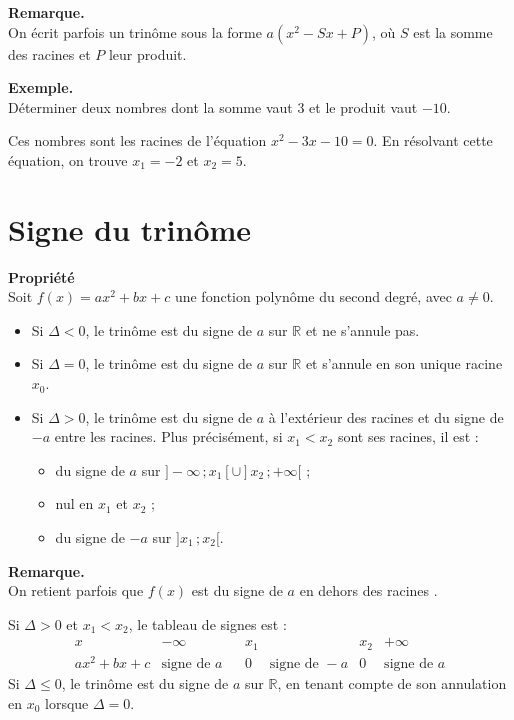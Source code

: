\documentclass[11pt]{article}
\newcommand{\RR}{\mathbb{R}}
\newenvironment{remarque}{\par\smallskip\noindent\textbf{Remarque. \\}\ignorespaces}{\par\smallskip}
\newenvironment{exemple}{\par\smallskip\noindent\textbf{Exemple. \\}\ignorespaces}{\par\smallskip}
\begin{document}
\begin{remarque}
On écrit parfois un trinôme sous la forme $a(x^2-Sx+P)$, où $S$ est la somme des racines et $P$ leur produit.
\end{remarque}

\begin{exemple}
Déterminer deux nombres dont la somme vaut $3$ et le produit vaut $-10$.

Ces nombres sont les racines de l'équation $x^2-3x-10=0$. En résolvant cette équation, on trouve $x_1=-2$ et $x_2=5$.
\end{exemple}

\section{Signe du trinôme}

\begin{propriete}
\textbf{Propriété}\\
Soit $f(x)=ax^2+bx+c$ une fonction polynôme du second degré, avec $a\neq0$.
\begin{itemize}
    \item Si $\Delta<0$, le trinôme est du signe de $a$ sur $\RR$ et ne s'annule pas.
    \item Si $\Delta=0$, le trinôme est du signe de $a$ sur $\RR$ et s'annule en son unique racine $x_0$.
    \item Si $\Delta>0$, le trinôme est du signe de $a$ à l'extérieur des racines et du signe de $-a$ entre les racines. Plus précisément, si $x_1<x_2$ sont ses racines, il est :
    \begin{itemize}
        \item du signe de $a$ sur $]-\infty\,;x_1[\cup]x_2\,;+\infty[$ ;
        \item nul en $x_1$ et $x_2$ ;
        \item du signe de $-a$ sur $]x_1\,;x_2[$.
    \end{itemize}
\end{itemize}
\end{propriete}

\begin{remarque}
On retient parfois que \og $f(x)$ est du signe de $a$ en dehors des racines \fg.
\end{remarque}

Si $\Delta>0$ et $x_1<x_2$, le tableau de signes est :
\[
\begin{array}{c|cccccc}
x & -\infty & & x_1 & & x_2 & +\infty\\ \hline
ax^2+bx+c & \text{signe de }a & & 0 & \text{signe de }-a & 0 & \text{signe de }a
\end{array}
\]
Si $\Delta\leq0$, le trinôme est du signe de $a$ sur $\RR$, en tenant compte de son annulation en $x_0$ lorsque $\Delta=0$.
\end{document}
